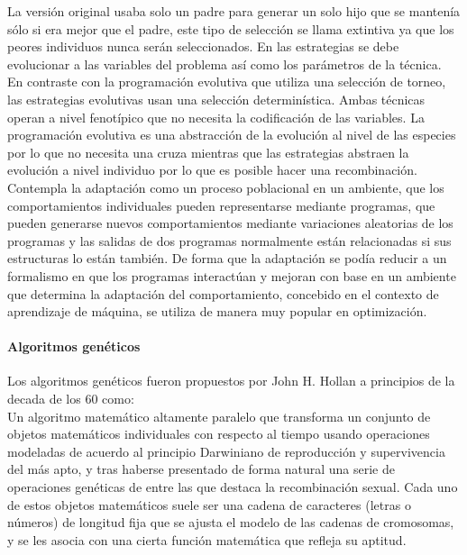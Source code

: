			La versión original usaba solo un padre para generar un solo hijo que se mantenía sólo si era mejor que el padre, este tipo de selección se llama extintiva ya que los peores individuos nunca serán seleccionados. En las estrategias se debe evolucionar a las variables del problema así como los parámetros de la técnica.\\
			
			En contraste con la programación evolutiva que utiliza una selección de torneo, las estrategias evolutivas usan una selección determinística. Ambas técnicas operan a nivel fenotípico que no necesita la codificación de las variables. La programación evolutiva es una abstracción de la evolución al nivel de las especies por lo que no necesita una cruza mientras que las estrategias abstraen la evolución a nivel individuo por lo que es posible hacer una recombinación.\\

			Contempla la adaptación como un proceso poblacional en un ambiente, que los comportamientos individuales pueden representarse mediante programas, que pueden generarse nuevos comportamientos mediante variaciones aleatorias de los programas y las salidas de dos programas normalmente están relacionadas si sus estructuras lo están también. De forma que la adaptación se podía reducir a un formalismo en que los programas interactúan y mejoran con base en un ambiente que determina la adaptación del comportamiento, concebido en el contexto de aprendizaje de máquina, se utiliza de manera muy popular en optimización.\\


			\paragraph{Algoritmos genéticos}
			Los algoritmos genéticos fueron propuestos por John H. Hollan a principios de la decada de los 60 como: \\
				Un algoritmo matemático altamente paralelo que transforma un conjunto de objetos matemáticos individuales con respecto al tiempo usando operaciones modeladas de acuerdo al principio Darwiniano de reproducción y supervivencia del más apto, y tras haberse presentado de forma natural una serie de operaciones genéticas de entre las que destaca la  recombinación sexual. Cada uno de estos objetos matemáticos suele ser una cadena de caracteres (letras o números) de longitud fija que se ajusta el modelo de las cadenas de cromosomas, y se les asocia con una cierta función matemática que refleja su aptitud.\\

